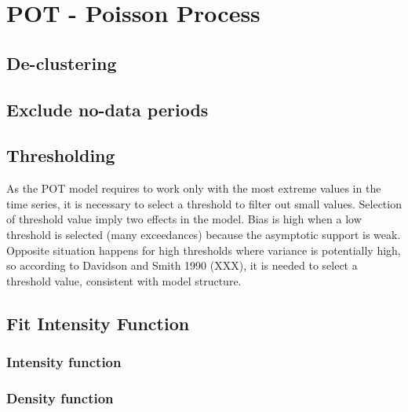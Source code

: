 \documentclass[12pt,oneside]{reedthesis}
\begin{document}
\hypertarget{pot---poisson-process}{%
\section{POT - Poisson Process}\label{pot---poisson-process}}

\hypertarget{de-clustering}{%
\subsection{De-clustering}\label{de-clustering}}

\hypertarget{exclude-no-data-periods}{%
\subsection{Exclude no-data periods}\label{exclude-no-data-periods}}

\hypertarget{thresholding}{%
\subsection{Thresholding}\label{thresholding}}

As the POT model requires to work only with the most extreme values in the time series, it is necessary to select a threshold to filter out small values. Selection of threshold value imply two effects in the model. Bias is high when a low threshold is selected (many exceedances) because the asymptotic support is weak. Opposite situation happens for high thresholds where variance is potentially high, so according to Davidson and Smith 1990 (XXX), it is needed to select a threshold value, consistent with model structure.

\hypertarget{fit-intensity-function}{%
\subsection{Fit Intensity Function}\label{fit-intensity-function}}

\hypertarget{intensity-function}{%
\subsubsection{Intensity function}\label{intensity-function}}

\hypertarget{density-function}{%
\subsubsection{Density function}\label{density-function}}
\end{document}
